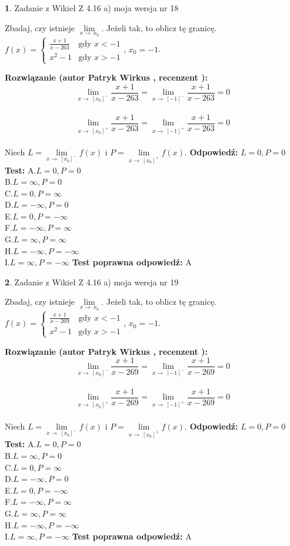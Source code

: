 \documentclass[12pt, a4paper]{article}
\theoremstyle{definition} %
\newtheorem{zad}{}
\newcommand{\zadStart}[1]{\begin{zad}#1\newline}
\newcommand{\zadStop}{\end{zad}}
\newcommand{\rozwStart}[2]{\noindent \textbf{Rozwiązanie (autor #1 , recenzent #2): }\newline}
\newcommand{\rozwStop}{\newline}
\newcommand{\odpStart}{\noindent \textbf{Odpowiedź:}\newline}
\newcommand{\odpStop}{\newline}
\newcommand{\testStart}{\noindent \textbf{Test:}\newline}
\newcommand{\testStop}{\newline}
\newcommand{\kluczStart}{\noindent \textbf{Test poprawna odpowiedź:}\newline}
\newcommand{\kluczStop}{\newline}
\begin{document}
\zadStart{Zadanie z Wikieł Z 4.16 a) moja wersja nr 18}

Zbadaj, czy istnieje $\lim\limits_{x\to\ x_{0}}$. Jeżeli tak, to oblicz tę granicę.\\   $f(x) = \left\{ \begin{array}{ll}
\frac{x+1}{x-263} & \textrm{gdy $x<-1$}\\
x^{2}-1 & \textrm{gdy $x>-1$}
\end{array} \right.$, $x_{0}=-1$.
\zadStop
\rozwStart{Patryk Wirkus}{}
$$\lim\limits_{x\to\ [x_{0}]^{-}}\frac{x+1}{x-263} = \lim\limits_{x\to\ [-1]^{-}}\frac{x+1}{x-263} = 0$$
\\
$$\lim\limits_{x\to\ [x_{0}]^{+}}\frac{x+1}{x-263} = \lim\limits_{x\to\ [-1]^{+}}\frac{x+1}{x-263} = 0$$
\\
Niech $L=\lim\limits_{x\to\ [x_{0}]^{-}}f(x)$ i $P=\lim\limits_{x\to\ [x_{0}]^{+}}f(x)$.
\rozwStop
\odpStart
$L=0, P=0$
\odpStop
\testStart
A.$L=0, P=0$\\ B.$L=\infty, P=0$\\ C.$L=0, P=\infty$\\ D.$L=-\infty, P=0$\\ E.$L=0, P=-\infty$\\
F.$L=-\infty, P=\infty$\\ G.$L=\infty, P=\infty$\\
H.$L=-\infty, P=-\infty$\\
I.$L=\infty, P=-\infty$
\testStop
\kluczStart
A
\kluczStop



\zadStart{Zadanie z Wikieł Z 4.16 a) moja wersja nr 19}

Zbadaj, czy istnieje $\lim\limits_{x\to\ x_{0}}$. Jeżeli tak, to oblicz tę granicę.\\   $f(x) = \left\{ \begin{array}{ll}
\frac{x+1}{x-269} & \textrm{gdy $x<-1$}\\
x^{2}-1 & \textrm{gdy $x>-1$}
\end{array} \right.$, $x_{0}=-1$.
\zadStop
\rozwStart{Patryk Wirkus}{}
$$\lim\limits_{x\to\ [x_{0}]^{-}}\frac{x+1}{x-269} = \lim\limits_{x\to\ [-1]^{-}}\frac{x+1}{x-269} = 0$$
\\
$$\lim\limits_{x\to\ [x_{0}]^{+}}\frac{x+1}{x-269} = \lim\limits_{x\to\ [-1]^{+}}\frac{x+1}{x-269} = 0$$
\\
Niech $L=\lim\limits_{x\to\ [x_{0}]^{-}}f(x)$ i $P=\lim\limits_{x\to\ [x_{0}]^{+}}f(x)$.
\rozwStop
\odpStart
$L=0, P=0$
\odpStop
\testStart
A.$L=0, P=0$\\ B.$L=\infty, P=0$\\ C.$L=0, P=\infty$\\ D.$L=-\infty, P=0$\\ E.$L=0, P=-\infty$\\
F.$L=-\infty, P=\infty$\\ G.$L=\infty, P=\infty$\\
H.$L=-\infty, P=-\infty$\\
I.$L=\infty, P=-\infty$
\testStop
\kluczStart
A
\kluczStop
\end{document}
